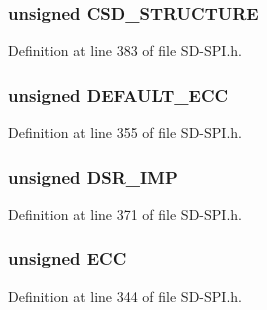 \subsubsection[{C\+S\+D\+\_\+\+S\+T\+R\+U\+C\+T\+U\+R\+E}]{\setlength{\rightskip}{0pt plus 5cm}unsigned C\+S\+D\+\_\+\+S\+T\+R\+U\+C\+T\+U\+R\+E}\label{union_c_s_d_a78f3c2b6b7cc51cf8ecf0a68051dd7e1}


Definition at line 383 of file S\+D-\/\+S\+P\+I.\+h.

\hypertarget{union_c_s_d_ab976dfdd761cebbdfdb770291fc8ea01}{}
\subsubsection[{D\+E\+F\+A\+U\+L\+T\+\_\+\+E\+C\+C}]{\setlength{\rightskip}{0pt plus 5cm}unsigned D\+E\+F\+A\+U\+L\+T\+\_\+\+E\+C\+C}\label{union_c_s_d_ab976dfdd761cebbdfdb770291fc8ea01}


Definition at line 355 of file S\+D-\/\+S\+P\+I.\+h.

\hypertarget{union_c_s_d_abde3a61cda4e6462f326c229e5e41cb4}{}
\subsubsection[{D\+S\+R\+\_\+\+I\+M\+P}]{\setlength{\rightskip}{0pt plus 5cm}unsigned D\+S\+R\+\_\+\+I\+M\+P}\label{union_c_s_d_abde3a61cda4e6462f326c229e5e41cb4}


Definition at line 371 of file S\+D-\/\+S\+P\+I.\+h.

\hypertarget{union_c_s_d_a0b66060063e348ad0cf4a49d2380f1df}{}
\subsubsection[{E\+C\+C}]{\setlength{\rightskip}{0pt plus 5cm}unsigned E\+C\+C}\label{union_c_s_d_a0b66060063e348ad0cf4a49d2380f1df}


Definition at line 344 of file S\+D-\/\+S\+P\+I.\+h.

\hypertarget{union_c_s_d_ade2242b8fbe922df9894d9cbd9e2d147}{}
